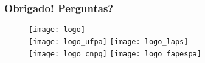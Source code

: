 \documentclass{beamer}
\begin{document}
\begin{frame}
   \large
   \frametitle{Obrigado! Perguntas?}
   \begin{figure}
      \texttt{[image: logo]}\\
      \texttt{[image: logo\_ufpa]}
      \texttt{[image: logo\_laps]}\\
      \texttt{[image: logo\_cnpq]}
      \texttt{[image: logo\_fapespa]}
   \end{figure}
\end{frame}
\end{document}

